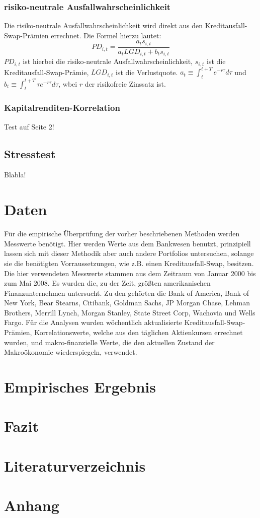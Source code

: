 \documentclass[a4paper,12pt]{scrartcl}
\begin{document}
\subsubsection{risiko-neutrale Ausfallwahrscheinlichkeit}
Die risiko-neutrale Ausfallwahrscheinlichkeit wird direkt aus den Kreditausfall-Swap-Prämien errechnet. Die Formel hierzu lautet: 
\begin{equation}
PD_{i,t}=\frac{a_t s_{i,t}}{a_t LGD_{i,t}+b_t s_{i,t}}
\end{equation}
$PD_{i,t}$ ist hierbei die risiko-neutrale Ausfallwahrscheinlichkeit, $s_{i,t}$ ist die Kreditausfall-Swap-Prämie, $LGD_{i,t}$ ist die Verlustquote. $a_t \equiv \int_{t}^{t+T} e^{-r \tau}d \tau$ und $b_t \equiv \int_{t}^{t+T} \tau e^{-r \tau}d \tau$, wbei $r$ der risikofreie Zinssatz ist.


\subsubsection{Kapitalrenditen-Korrelation}
Test auf Seite 2!
\newpage
\subsection{Stresstest}

Blabla!
\newpage
\section{Daten}
Für die empirische Überprüfung der vorher beschriebenen Methoden werden Messwerte benötigt. Hier werden Werte aus dem Bankwesen benutzt, prinzipiell lassen sich mit dieser Methodik aber auch andere Portfolios untersuchen, solange sie die benötigten Vorraussetzungen, wie z.B. einen Kreditausfall-Swap, besitzen. 
Die hier verwendeten Messwerte stammen aus dem Zeitraum von Januar 2000 bis zum Mai 2008. Es wurden die, zu der Zeit, größten amerikanischen Finanzunternehmen untersucht. Zu den gehörten die Bank of America, Bank of New York, Bear Stearns, Citibank, Goldman Sachs, JP Morgan Chase, Lehman Brothers, Merrill Lynch, Morgan Stanley, State Street Corp, Wachovia und Wells Fargo. 
Für die Analysen wurden wöchentlich aktualisierte Kreditausfall-Swap-Prämien, Korrelationswerte, welche aus den täglichen Aktienkursen errechnet wurden, und makro-finanzielle Werte, die den aktuellen Zustand der Makroökonomie wiederspiegeln,  verwendet.

\newpage
\section{Empirisches Ergebnis}
\newpage
\section{Fazit}
\newpage
\section{Literaturverzeichnis}
\newpage

\section{Anhang}
\end{document}
